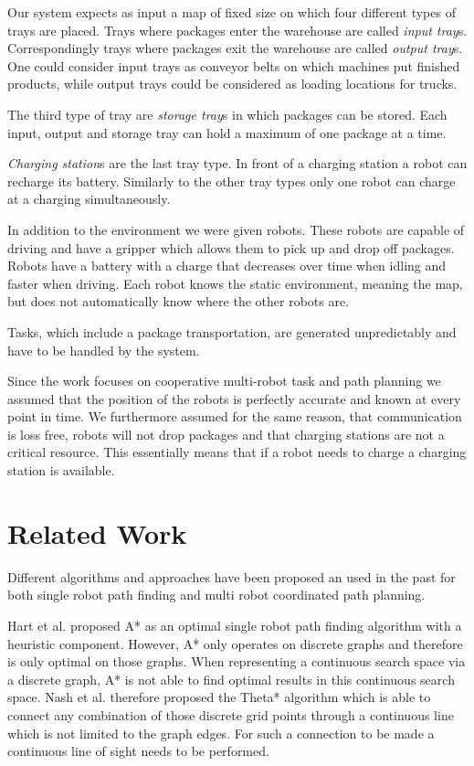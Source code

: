 \documentclass[journal]{IEEEtran}
\begin{document}
Our system expects as input a map of fixed size on which four different types of trays are placed.
Trays where packages enter the warehouse are called \textit{input tray}s. Correspondingly trays where packages exit the warehouse are called \textit{output tray}s. 
One could consider input trays as conveyor belts on which machines put finished products, while output trays could be considered as loading locations for trucks.

The third type of tray are \textit{storage tray}s in which packages can be stored.
Each input, output and storage tray can hold a maximum of one package at a time.

\textit{Charging station}s are the last tray type. In front of a charging station a robot can recharge its battery. 
Similarly to the other tray types only one robot can charge at a charging simultaneously.

In addition to the environment we were given robots. 
These robots are capable of driving and have a gripper which allows them to pick up and drop off packages. 
Robots have a battery with a charge that decreases over time when idling and faster when driving.
Each robot knows the static environment, meaning the map, but does not automatically know where the other robots are. 

Tasks, which include a package transportation, are generated unpredictably and have to be handled by the system.

Since the work focuses on cooperative multi-robot task and path planning we assumed that the position of the robots is perfectly accurate and known at every point in time.
We furthermore assumed for the same reason, that communication is loss free, robots will not drop packages and that charging stations are not a critical resource.
This essentially means that if a robot needs to charge a charging station is available. 


\section{Related Work}
\label{sec:related_work}
Different algorithms and approaches have been proposed an used in the past for both single robot path finding and multi robot coordinated path planning. 

Hart et al.\cite{AStar} proposed A* as an optimal single robot path finding algorithm with a heuristic component. However, A* only operates on discrete graphs and therefore is only optimal on those graphs. When representing a continuous search space via a discrete graph, A* is not able to find optimal results in this continuous search space. Nash et al.\cite{ThetaStar} therefore proposed the Theta* algorithm which is able to connect any combination of those discrete grid points through a continuous line which is not limited to the graph edges. For such a connection to be made a continuous line of sight needs to be performed.
\end{document}
